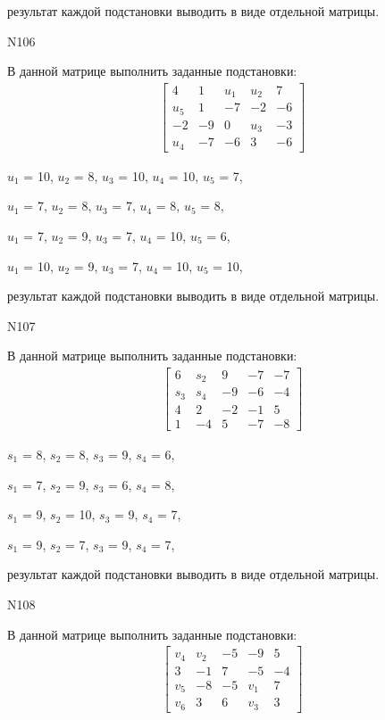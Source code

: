 \documentclass[11pt]{report}
\begin{document}
результат каждой подстановки выводить в виде отдельной матрицы.

N106

В данной матрице выполнить заданные подстановки:
\begin{align*}
\left[\begin{matrix}4 & 1 & u_{1} & u_{2} & 7\\u_{5} & 1 & -7 & -2 & -6\\-2 & -9 & 0 & u_{3} & -3\\u_{4} & -7 & -6 & 3 & -6\end{matrix}\right]
\end{align*}


$u_{1}$ = 10, $u_{2}$ = 8, $u_{3}$ = 10, $u_{4}$ = 10, $u_{5}$ = 7, 

$u_{1}$ = 7, $u_{2}$ = 8, $u_{3}$ = 7, $u_{4}$ = 8, $u_{5}$ = 8, 

$u_{1}$ = 7, $u_{2}$ = 9, $u_{3}$ = 7, $u_{4}$ = 10, $u_{5}$ = 6, 

$u_{1}$ = 10, $u_{2}$ = 9, $u_{3}$ = 7, $u_{4}$ = 10, $u_{5}$ = 10, 

результат каждой подстановки выводить в виде отдельной матрицы.

N107

В данной матрице выполнить заданные подстановки:
\begin{align*}
\left[\begin{matrix}6 & s_{2} & 9 & -7 & -7\\s_{3} & s_{4} & -9 & -6 & -4\\4 & 2 & -2 & -1 & 5\\1 & -4 & 5 & -7 & -8\end{matrix}\right]
\end{align*}


$s_{1}$ = 8, $s_{2}$ = 8, $s_{3}$ = 9, $s_{4}$ = 6, 

$s_{1}$ = 7, $s_{2}$ = 9, $s_{3}$ = 6, $s_{4}$ = 8, 

$s_{1}$ = 9, $s_{2}$ = 10, $s_{3}$ = 9, $s_{4}$ = 7, 

$s_{1}$ = 9, $s_{2}$ = 7, $s_{3}$ = 9, $s_{4}$ = 7, 

результат каждой подстановки выводить в виде отдельной матрицы.

N108

В данной матрице выполнить заданные подстановки:
\begin{align*}
\left[\begin{matrix}v_{4} & v_{2} & -5 & -9 & 5\\3 & -1 & 7 & -5 & -4\\v_{5} & -8 & -5 & v_{1} & 7\\v_{6} & 3 & 6 & v_{3} & 3\end{matrix}\right]
\end{align*}
\end{document}
